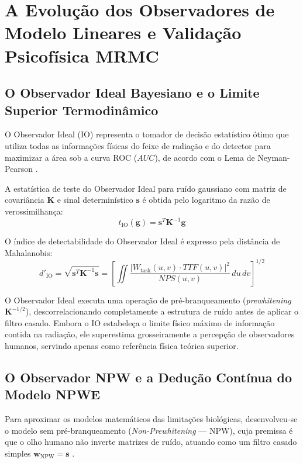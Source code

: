 \chapter{A Evolução dos Observadores de Modelo Lineares e Validação Psicofísica MRMC}
\label{chap:observadores_lineares}

\section{O Observador Ideal Bayesiano e o Limite Superior Termodinâmico}
\label{sec:io}

O Observador Ideal (IO) representa o tomador de decisão estatístico ótimo que utiliza todas as informações físicas do feixe de radiação e do detector para maximizar a área sob a curva ROC ($AUC$), de acordo com o Lema de Neyman-Pearson \cite{barrett_myers_2004}.

A estatística de teste do Observador Ideal para ruído gaussiano com matriz de covariância $\mathbf{K}$ e sinal determinístico $\mathbf{s}$ é obtida pelo logaritmo da razão de verossimilhança:
\begin{equation}
  t_{\text{IO}}(\mathbf{g}) = \mathbf{s}^T \mathbf{K}^{-1} \mathbf{g}
  \label{eq:io_estatistica}
\end{equation}

O índice de detectabilidade do Observador Ideal é expresso pela distância de Mahalanobis:
\begin{equation}
  d'_{\text{IO}} = \sqrt{\mathbf{s}^T \mathbf{K}^{-1} \mathbf{s}} = \left[ \iint \frac{\left| W_{\text{task}}(u, v) \cdot TTF(u, v) \right|^2}{NPS(u, v)} \, du \, dv \right]^{1/2}
  \label{eq:io_dprime}
\end{equation}

O Observador Ideal executa uma operação de pré-branqueamento (\emph{prewhitening} $\mathbf{K}^{-1/2}$), descorrelacionando completamente a estrutura de ruído antes de aplicar o filtro casado. Embora o IO estabeleça o limite físico máximo de informação contida na radiação, ele superestima grosseiramente a percepção de observadores humanos, servindo apenas como referência física teórica superior.

\section{O Observador NPW e a Dedução Contínua do Modelo NPWE}
\label{sec:npwe}

Para aproximar os modelos matemáticos das limitações biológicas, desenvolveu-se o modelo sem pré-branqueamento (\emph{Non-Prewhitening} --- NPW), cuja premissa é que o olho humano não inverte matrizes de ruído, atuando como um filtro casado simples $\mathbf{w}_{\text{NPW}} = \mathbf{s}$ \cite{burgess1994}.

